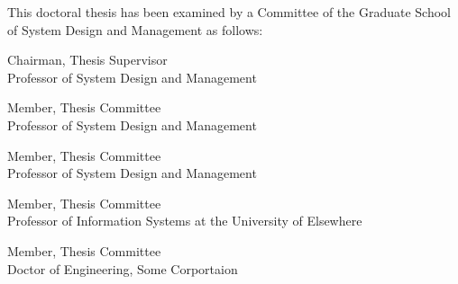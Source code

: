 %
%
%

\begin{titlepage}
\begin{large}
This doctoral thesis has been examined by a Committee of the Graduate School of System Design and Management as follows:

\signature{Professor Taro Keio}{Chairman, Thesis Supervisor \\
   Professor of System Design and Management}

\signature{Professor Hanako System}{Member, Thesis Committee \\
   Professor of System Design and Management}

\signature{Professor Jiro Design}{Member, Thesis Committee \\
   Professor of System Design and Management}

\signature{Professor Kusako Management}{Member, Thesis Committee \\
   Professor of Information Systems at the University of Elsewhere}

\signature{Doctor Saburo Company}{Member, Thesis Committee \\
   Doctor of Engineering, Some Corportaion}

 \end{large}
\end{titlepage}

